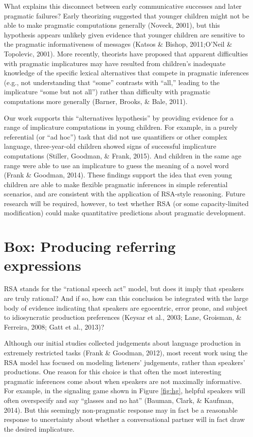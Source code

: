 \documentclass[]{elsarticle}
\begin{document}
What explains this disconnect between early communicative successes and
later pragmatic failures? Early theorizing suggested that younger
children might not be able to make pragmatic computations generally
(Noveck, 2001), but this hypothesis appears unlikely given evidence that
younger children are sensitive to the pragmatic informativeness of
messages (Katsos \& Bishop, 2011;O'Neil \& Topolevic, 2001). More
recently, theorists have proposed that apparent difficulties with
pragmatic implicatures may have resulted from children's inadequate
knowledge of the specific lexical alternatives that compete in pragmatic
inferences (e.g., not understanding that ``some'' contrasts with
``all,'' leading to the implicature ``some but not all'') rather than
difficulty with pragmatic computations more generally (Barner, Brooks,
\& Bale, 2011).

Our work supports this ``alternatives hypothesis'' by providing evidence
for a range of implicature computations in young children. For example,
in a purely referential (or ``ad hoc'') task that did not use
quantifiers or other complex language, three-year-old children showed
signs of successful implicature computations (Stiller, Goodman, \&
Frank, 2015). And children in the same age range were able to use an
implicature to guess the meaning of a novel word (Frank \& Goodman,
2014). These findings support the idea that even young children are able
to make flexible pragmatic inferences in simple referential scenarios,
and are consistent with the application of RSA-style reasoning. Future
research will be required, however, to test whether RSA (or some
capacity-limited modification) could make quantitative predictions about
pragmatic development.

\section{Box: Producing referring expressions
}\label{box-producing-referring-expressions}

RSA stands for the ``rational speech act'' model, but does it imply that
speakers are truly rational? And if so, how can this conclusion be
integrated with the large body of evidence indicating that speakers are
egocentric, error prone, and subject to idiosyncratic production
preferences (Keysar et al., 2003; Lane, Groisman, \& Ferreira, 2008;
Gatt et al., 2013)?

Although our initial studies collected judgements about language
production in extremely restricted tasks (Frank \& Goodman, 2012), most
recent work using the RSA model has focused on modeling listeners'
judgements, rather than speakers' productions. One reason for this
choice is that often the most interesting pragmatic inferences come
about when speakers are not maximally informative. For example, in the
signaling game shown in Figure \ref{fig:hg}, helpful speakers will often
overspecify and say ``glasses and no hat'' (Bauman, Clark, \& Kaufman,
2014). But this seemingly non-pragmatic response may in fact be a
reasonable response to uncertainty about whether a conversational
partner will in fact draw the desired implicature.
\end{document}
